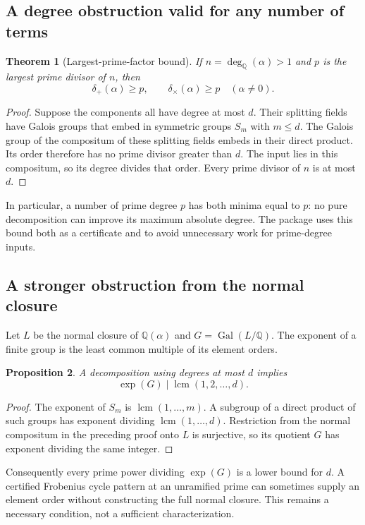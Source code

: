 \documentclass[11pt,letterpaper]{article}
\newtheorem{theorem}{Theorem}[section]
\newtheorem{proposition}[theorem]{Proposition}
\theoremstyle{definition}
\newcommand{\Q}{\mathbb Q}
\newcommand{\Gal}{\operatorname{Gal}}
\newcommand{\lcm}{\operatorname{lcm}}
\newcommand{\dq}{\deg_{\Q}}
\newcommand{\dplus}{\delta_{+}}
\newcommand{\dtimes}{\delta_{\times}}
\begin{document}
\subsection{A degree obstruction valid for any number of terms}
\begin{samepage}
\begin{theorem}[Largest-prime-factor bound]\label{thm:primebound}
If $n=\dq(\alpha)>1$ and $p$ is the largest prime divisor of $n$, then
\[
 \dplus(\alpha)\ge p,\qquad \dtimes(\alpha)\ge p\quad(\alpha\ne0).
\]
\end{theorem}
\end{samepage}
\begin{proof}
Suppose the components all have degree at most $d$. Their splitting fields have Galois groups that embed in symmetric groups $S_m$ with $m\le d$. The Galois group of the compositum of these splitting fields embeds in their direct product. Its order therefore has no prime divisor greater than $d$. The input lies in this compositum, so its degree divides that order. Every prime divisor of $n$ is at most $d$.
\end{proof}
In particular, a number of prime degree $p$ has both minima equal to $p$: no pure decomposition can improve its maximum absolute degree. The package uses this bound both as a certificate and to avoid unnecessary work for prime-degree inputs.

\subsection{A stronger obstruction from the normal closure}
Let $L$ be the normal closure of $\Q(\alpha)$ and $G=\Gal(L/\Q)$. The exponent of a finite group is the least common multiple of its element orders.
\begin{proposition}\label{prop:exponent}
A decomposition using degrees at most $d$ implies
\[
 \exp(G)\mid \lcm(1,2,\ldots,d).
\]
\end{proposition}
\begin{proof}
The exponent of $S_m$ is $\lcm(1,\ldots,m)$. A subgroup of a direct product of such groups has exponent dividing $\lcm(1,\ldots,d)$. Restriction from the normal compositum in the preceding proof onto $L$ is surjective, so its quotient $G$ has exponent dividing the same integer.
\end{proof}
Consequently every prime power dividing $\exp(G)$ is a lower bound for $d$. A certified Frobenius cycle pattern at an unramified prime can sometimes supply an element order without constructing the full normal closure. This remains a necessary condition, not a sufficient characterization.
\end{document}
